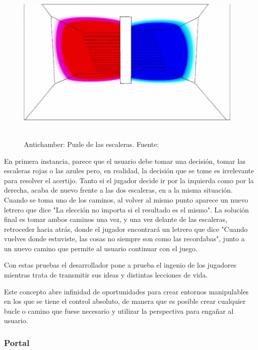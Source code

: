 \documentclass[../main.tex]{subfiles}
\begin{document}
\begin{figure}[htbp]
\centering
\includegraphics[width= 11cm, height= 8cm]{imagenes/Antichamber_puzzle.jpg}
\caption{Antichamber: Puzle de las escaleras. Fuente:\cite{Antichamber_Puzzle}}
\label{fig:Antichamber_Puzzle}
\end{figure}

En primera instancia, parece que el usuario debe tomar una decisión, tomar las escaleras rojas o las azules pero, en realidad, la decisión que se tome es irrelevante para resolver el acertijo. Tanto si el jugador decide ir por la izquierda como por la derecha, acaba de nuevo frente a las dos escaleras, en a la misma situación. Cuando se toma uno de los caminos, al volver al mismo punto aparece un nuevo letrero que dice "La elección no importa si el resultado es el mismo". La solución final es tomar ambos caminos una vez, y una vez delante de las escaleras, retroceder hacia atrás, donde el jugador encontrará un letrero que dice "\uppercase{C}uando vuelves donde estuviste, las cosas no siempre son como las recordabas", junto a un nuevo camino que permite al usuario continuar con el juego.

Con estas pruebas el desarrollador pone a prueba el ingenio de los jugadores mientras trata de transmitir sus ideas y distintas lecciones de vida.

Este concepto abre infinidad de oportunidades para crear entornos manipulables en los que se tiene el control absoluto, de manera que es posible crear cualquier bucle o camino que fuese necesario y utilizar la perspectiva para engañar al usuario.

\subsubsection{Portal}
\end{document}
